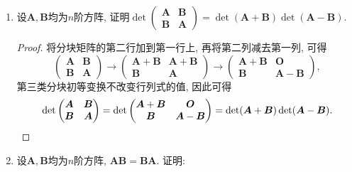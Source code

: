 \begin{3b}
\begin{enumerate}
\begin{proof}
\[\begin{split}
\begin{pmatrix}
\boldsymbol{A}+{\rm i}\boldsymbol{B}&\boldsymbol{O}\\
\boldsymbol{B}&\boldsymbol{A}-{\rm i}\boldsymbol{B}
\end{pmatrix}=\det(\boldsymbol{A}+{\rm i}\boldsymbol{B})
\det(\boldsymbol{A}-{\rm i}\boldsymbol{B})\\
&=\det((\boldsymbol{A}+{\rm i}\boldsymbol{B})(\boldsymbol{A}-{\rm i}\boldsymbol{B}))
=\det(\boldsymbol{A}^2+\boldsymbol{B}^2-{\rm i}(\boldsymbol{AB}-\boldsymbol{BA}))
=\det(\boldsymbol{A}^2+\boldsymbol{B}^2).\end{split}\]
\end{proof}
\item 设\(\boldsymbol{A},\boldsymbol{B}\)均为\(n\)阶方阵, 证明\(\det\begin{pmatrix}
    \boldsymbol{A}&\boldsymbol{B}\\\boldsymbol{B}&\boldsymbol{A}
\end{pmatrix}=\det(\boldsymbol{A}+\boldsymbol{B})\det(\boldsymbol{A}-\boldsymbol{B})\).
\begin{proof}
将分块矩阵的第二行加到第一行上, 再将第二列减去第一列, 可得\[\begin{pmatrix}
\boldsymbol{A}&\boldsymbol{B}\\\boldsymbol{B}&\boldsymbol{A}
\end{pmatrix}\rightarrow\begin{pmatrix}
\boldsymbol{A}+\boldsymbol{B}&\boldsymbol{A}+\boldsymbol{B}\\\boldsymbol{B}&\boldsymbol{A}
\end{pmatrix}\rightarrow \begin{pmatrix}
\boldsymbol{A}+\boldsymbol{B}&\boldsymbol{O}\\\boldsymbol{B}&\boldsymbol{A}-\boldsymbol{B}
\end{pmatrix},\]第三类分块初等变换不改变行列式的值, 因此可得
\[\det\begin{pmatrix}
    \boldsymbol{A}&\boldsymbol{B}\\\boldsymbol{B}&\boldsymbol{A}
\end{pmatrix}=\det\begin{pmatrix}
\boldsymbol{A}+\boldsymbol{B}&\boldsymbol{O}\\\boldsymbol{B}&\boldsymbol{A}-\boldsymbol{B}
\end{pmatrix}=\det(\boldsymbol{A}+\boldsymbol{B})\det(\boldsymbol{A}-\boldsymbol{B}).\qedhere\]
\end{proof}
\item 设\(\boldsymbol{A,B}\)均为\(n\)阶方阵, \(\boldsymbol{AB}=\boldsymbol{BA}\). 证明:

\end{enumerate}
\end{3b}
